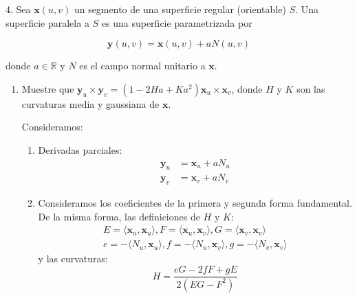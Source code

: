 \begin{problema}
    4. Sea $\mathbf{x}(u, v)$ un segmento de una superficie regular (orientable) $S$. Una superficie paralela a $S$ es una superficie parametrizada por

$$\mathbf{y}(u, v)=\mathbf{x}(u, v)+a N(u, v)$$

    donde $a \in \mathbb{R}$ y $N$ es el campo normal unitario a $\mathbf{x}$.

    \begin{enumerate}
        \item Muestre que $\mathbf{y}_{u} \times \mathbf{y}_{v}=\left(1-2 H a+K a^{2}\right) \mathbf{x}_{u} \times \mathbf{x}_{v}$, donde $H$ y $K$ son las curvaturas media y gaussiana de $\mathbf{x}$.
        \begin{sol}
            Consideramos: 
            \begin{enumerate}
                \item Derivadas parciales: 
                \begin{align*}
                    \mathbf{y}_{u} &= \mathbf{x}_{u} + a N_{u}\\
                    \mathbf{y}_{v} &= \mathbf{x}_{v} + a N_{v}
                \end{align*}
                \item Consideramos los coeficientes de la primera y segunda forma fundamental. De la misma forma, las definiciones de $H$ y $K$: 
                \begin{align*}
                    E = \langle\mathbf{x}_u, \mathbf{x}_u\rangle, F = \langle\mathbf{x}_u, \mathbf{x}_v\rangle, G = \langle\mathbf{x}_v, \mathbf{x}_v\rangle\\ e = -\langle N_u, \mathbf{x}_u\rangle, f = -\langle N_u, \mathbf{x}_v\rangle, g = -\langle N_v, \mathbf{x}_v\rangle
                \end{align*}
                y las curvaturas: $$H = \frac{eG - 2fF + gE}{2(EG - F^2)}$$
                

\end{enumerate}
\end{sol}
\end{enumerate}
\end{problema}
